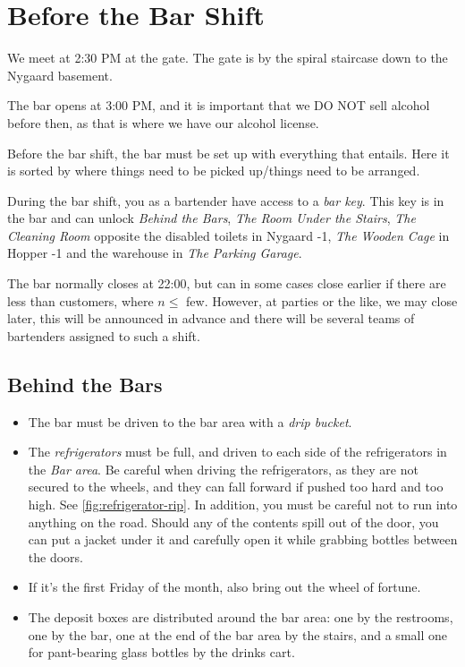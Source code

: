 \section{Before the Bar Shift}
\label{sec:pre-bar-shift}

We meet at 2:30 PM at the gate. The gate is by the spiral staircase down to the Nygaard basement.

The bar opens at 3:00 PM, and it is important
that we DO NOT sell alcohol before then, as that is where we have our alcohol license.

Before the bar shift, the bar must be set up with everything that entails. Here
it is sorted by where things need to be picked up/things need to be arranged.

During the bar shift, you as a bartender have access to a \textit{bar key}.
This key is in the bar and can unlock \textit{Behind the Bars},
\textit{The Room Under the Stairs},
\textit{The Cleaning Room} opposite the disabled toilets in Nygaard -1,
\textit{The Wooden Cage} in Hopper -1
and the warehouse in \textit{The Parking Garage}.

The bar normally closes at 22:00, but can in some cases close earlier if there are less
than customers, where $n \le$ few.
However, at parties or the like, we may close later, this will be announced in advance and there will
be several teams of bartenders assigned to such a shift.

\subsection{Behind the Bars}
\label{sec:pre:behind-the-bars}

\begin{itemize}
	\item The bar must be driven to the bar area with a \textit{drip bucket}.
	\item The \textit{refrigerators} must be full, and driven to each side of the refrigerators in the
	\textit{Bar area}. Be careful when driving the refrigerators, as they are not secured to the wheels,
	and they can fall forward if pushed too hard and too high. See \autoref{fig:refrigerator-rip}. In addition,
	you must be careful not to run into anything on the road. Should any of the contents spill out of the door, you can put a jacket
	under it and carefully open it while grabbing bottles between the doors.
	\item If it's the first Friday of the month, also bring out the wheel of fortune.
	\item The deposit boxes are distributed around the bar area: one by the restrooms, one by the bar, 
	one at the end of the bar area by the stairs, and a small one for pant-bearing glass bottles by the drinks cart.
\end{itemize}

